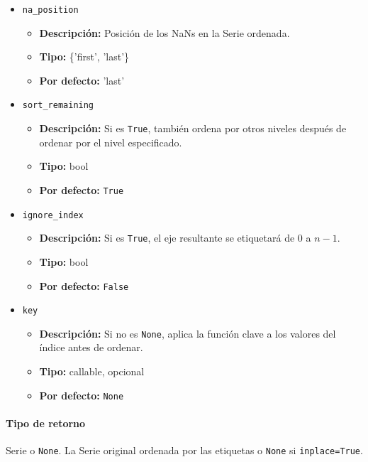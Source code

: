 \begin{itemize}
\begin{itemize}
            \end{itemize}
        \item \texttt{na\_position}
            \begin{itemize}
                \item \textbf{Descripción:} Posición de los NaNs en la Serie ordenada.
                \item \textbf{Tipo:} \{'first', 'last'\}
                \item \textbf{Por defecto:} 'last'
            \end{itemize}
        \item \texttt{sort\_remaining}
            \begin{itemize}
                \item \textbf{Descripción:} Si es \texttt{True}, también ordena por otros niveles después de ordenar por el nivel especificado.
                \item \textbf{Tipo:} bool
                \item \textbf{Por defecto:} \texttt{True}
            \end{itemize}
        \item \texttt{ignore\_index}
            \begin{itemize}
                \item \textbf{Descripción:} Si es \texttt{True}, el eje resultante se etiquetará de 0 a \( n - 1 \).
                \item \textbf{Tipo:} bool
                \item \textbf{Por defecto:} \texttt{False}
            \end{itemize}
        \item \texttt{key}
            \begin{itemize}
                \item \textbf{Descripción:} Si no es \texttt{None}, aplica la función clave a los valores del índice antes de ordenar.
                \item \textbf{Tipo:} callable, opcional
                \item \textbf{Por defecto:} \texttt{None}
            \end{itemize}
    \end{itemize}

    \paragraph{Tipo de retorno}
    Serie o \texttt{None}. La Serie original ordenada por las etiquetas o \texttt{None} si \texttt{inplace=True}.


